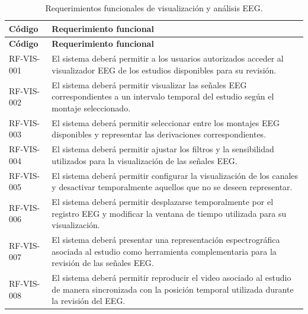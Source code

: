 \begin{longtable}{|p{}|p{}|}
    \caption{Requerimientos funcionales de visualización y análisis EEG.}
    \label{tab:rf-vis}\\
    \hline
    \textbf{Código} & \textbf{Requerimiento funcional} \\
    \hline
    \endfirsthead

    \hline
    \textbf{Código} & \textbf{Requerimiento funcional} \\
    \hline
    \endhead

    RF-VIS-001 &
    El sistema deberá permitir a los usuarios autorizados acceder al
    visualizador EEG de los estudios disponibles para su revisión. \\
    \hline

    RF-VIS-002 &
    El sistema deberá permitir visualizar las señales EEG correspondientes a
    un intervalo temporal del estudio según el montaje seleccionado. \\
    \hline

    RF-VIS-003 &
    El sistema deberá permitir seleccionar entre los montajes EEG disponibles
    y representar las derivaciones correspondientes. \\
    \hline

    RF-VIS-004 &
    El sistema deberá permitir ajustar los filtros y la sensibilidad utilizados
    para la visualización de las señales EEG. \\
    \hline

    RF-VIS-005 &
    El sistema deberá permitir configurar la visualización de los canales y
    desactivar temporalmente aquellos que no se deseen representar. \\
    \hline

    RF-VIS-006 &
    El sistema deberá permitir desplazarse temporalmente por el registro EEG y
    modificar la ventana de tiempo utilizada para su visualización. \\
    \hline

    RF-VIS-007 &
    El sistema deberá presentar una representación espectrográfica asociada al
    estudio como herramienta complementaria para la revisión de las señales
    EEG. \\
    \hline

    RF-VIS-008 &
    El sistema deberá permitir reproducir el video asociado al estudio de
    manera sincronizada con la posición temporal utilizada durante la revisión
    del EEG. \\
    \hline


\end{longtable}
